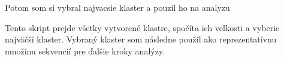 Potom som si vybral najvacsie klaster a pouzil ho na analyzu

Tento skript prejde všetky vytvorené klastre, spočíta ich veľkosti a vyberie najväčší klaster. Vybraný klaster som následne použil ako reprezentatívnu množinu sekvencií pre ďalšie kroky analýzy.

